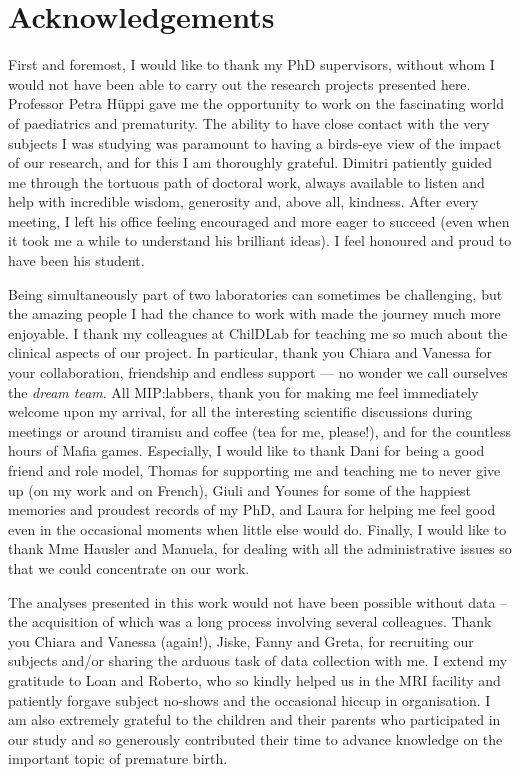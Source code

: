 \chapter*{Acknowledgements}

\bigskip

First and foremost, I would like to thank my PhD supervisors, without whom I would not have been able to carry out the research projects presented here. Professor Petra Hüppi gave me the opportunity to work on the fascinating world of paediatrics and prematurity. The ability to have close contact with the very subjects I was studying was paramount to having a birds-eye view of the impact of our research, and for this I am thoroughly grateful. Dimitri patiently guided me through the tortuous path of doctoral work, always available to listen and help with incredible wisdom, generosity and, above all, kindness. After every meeting, I left his office feeling encouraged and more eager to succeed (even when it took me a while to understand his brilliant ideas). I feel honoured and proud to have been his student.   

Being simultaneously part of two laboratories can sometimes be challenging, but the amazing people I had the chance to work with made the journey much more enjoyable. I thank my colleagues at ChilDLab for teaching me so much about the clinical aspects of our project. In particular, thank you Chiara and Vanessa for your collaboration, friendship and endless support --- no wonder we call ourselves the \textit{dream team}. All MIP:labbers, thank you for making me feel immediately welcome upon my arrival, for all the interesting scientific discussions during meetings or around tiramisu and coffee (tea for me, please!), and for the countless hours of Mafia games. Especially, I would like to thank Dani for being a good friend and role model, Thomas for supporting me and teaching me to never give up (on my work and on French), Giuli and Younes for some of the happiest memories and proudest records of my PhD, and Laura for helping me feel good even in the occasional moments when little else would do.  Finally, I would like to thank Mme Hausler and Manuela, for dealing with all the administrative issues so that we could concentrate on our work.

The analyses presented in this work would not have been possible without data – the acquisition of which was a long process involving several colleagues. Thank you Chiara and Vanessa (again!), Jiske, Fanny and Greta, for recruiting our subjects and/or sharing the arduous task of data collection with me. I extend my gratitude to Loan and Roberto, who so kindly helped us in the MRI facility and patiently forgave subject no-shows and the occasional hiccup in organisation. I am also extremely grateful to the children and their parents who participated in our study and so generously contributed their time to advance knowledge on the important topic of premature birth.

